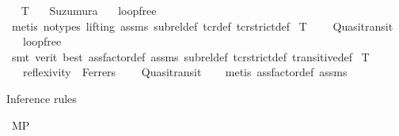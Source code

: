 \begin{isabellebody}
{\isafoldproof}%
%
\isadelimproof
\ \isanewline
%
\endisadelimproof
\isanewline
{}\isamarkupfalse%
\ T{}{\isacharcolon}{\kern0pt}\isanewline
\ \ \ Suzumura\isanewline
\ \ \ loopfree\isanewline
\ \ %
\isanewline
%
\isadelimproof
\ \ %
\endisadelimproof
%
\isatagproof
{}\isamarkupfalse%
\ {\isacharparenleft}{\kern0pt}metis\ {\isacharparenleft}{\kern0pt}no{\isacharunderscore}{\kern0pt}types{\isacharcomma}{\kern0pt}\ lifting{\isacharparenright}{\kern0pt}\ assms\ sub{\isacharunderscore}{\kern0pt}rel{\isacharunderscore}{\kern0pt}def\ tcr{\isacharunderscore}{\kern0pt}def\ tcr{\isacharunderscore}{\kern0pt}strict{\isacharunderscore}{\kern0pt}def{\isacharparenright}{\kern0pt}%
\endisatagproof
{\isafoldproof}%
%
\isadelimproof
\isanewline
%
\endisadelimproof
\isanewline
{}\isamarkupfalse%
\ T{}{\isacharcolon}{\kern0pt}\ \isanewline
\ \ \ Quasitransit\ \isanewline
\ \ \ loopfree\isanewline
\ \ %
\isanewline
%
\isadelimproof
\ \ %
\endisadelimproof
%
\isatagproof
{}\isamarkupfalse%
\ {\isacharparenleft}{\kern0pt}smt\ {\isacharparenleft}{\kern0pt}verit{\isacharcomma}{\kern0pt}\ best{\isacharparenright}{\kern0pt}\ assfactor{\isacharunderscore}{\kern0pt}def\ assms\ sub{\isacharunderscore}{\kern0pt}rel{\isacharunderscore}{\kern0pt}def\ tcr{\isacharunderscore}{\kern0pt}strict{\isacharunderscore}{\kern0pt}def\ transitive{\isacharunderscore}{\kern0pt}def{\isacharparenright}{\kern0pt}%
\endisatagproof
{\isafoldproof}%
%
\isadelimproof
\isanewline
%
\endisadelimproof
\isanewline
{}\isamarkupfalse%
\ T{}{\isacharcolon}{\kern0pt}\ \isanewline
\ \ \ reflexivity\ \ Ferrers\ \isanewline
\ \ \ Quasitransit\isanewline
%
\isadelimproof
\ \ %
\endisadelimproof
%
\isatagproof
{}\isamarkupfalse%
\ {\isacharparenleft}{\kern0pt}metis\ assfactor{\isacharunderscore}{\kern0pt}def\ assms{\isacharparenright}{\kern0pt}%
\endisatagproof
{\isafoldproof}%
%
\isadelimproof
%
\endisadelimproof
%
\isadelimdocument
%
\endisadelimdocument
%
\isatagdocument
%
\isamarkuptrue%
%
\endisatagdocument
{\isafolddocument}%
%
\isadelimdocument
%
\endisadelimdocument
%
\begin{isamarkuptext}%
Inference rules%
\end{isamarkuptext}\isamarkuptrue%
\isamarkupfalse%
\ MP{\isacharcolon}{\kern0pt}\ {\isachardoublequoteopen}{\isasymlbrakk}{\isasymlfloor}{\isasymphi}{\isasymrfloor}{\isacharsemicolon}{\kern0pt}\ {\isasymlfloor}{\isasymphi}\ \isactrlbold {\isasymrightarrow}\ {\isasympsi}{\isasymrfloor}{\isasymrbrakk}\ {\isasymLongrightarrow}\ {\isasymlfloor}{\isasympsi}{\isasymrfloor}{\isachardoublequoteclose}%

\end{isabellebody}
